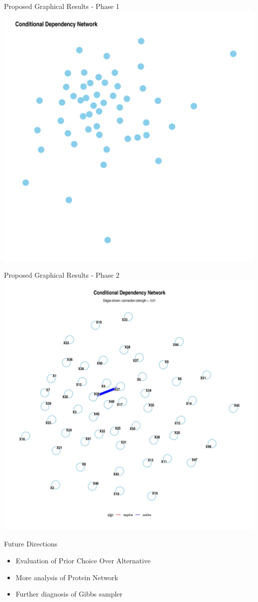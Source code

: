 \documentclass{beamer}
\begin{document}
\begin{frame}{Proposed Graphical Results - Phase 1}
\centering
    \includegraphics[scale=0.33]{Conditional_density_network.png}
\end{frame}

\begin{frame}{Proposed Graphical Results - Phase 2}
\centering
    \includegraphics[scale=0.25]{Conditional_density_network_labeled.png}
\end{frame}

\begin{frame}{Future Directions}
    \begin{itemize}
        \item Evaluation of Prior Choice Over Alternative
        \item More analysis of Protein Network
        \item Further diagnosis of Gibbs sampler 
    \end{itemize}
\end{frame}
\end{document}
